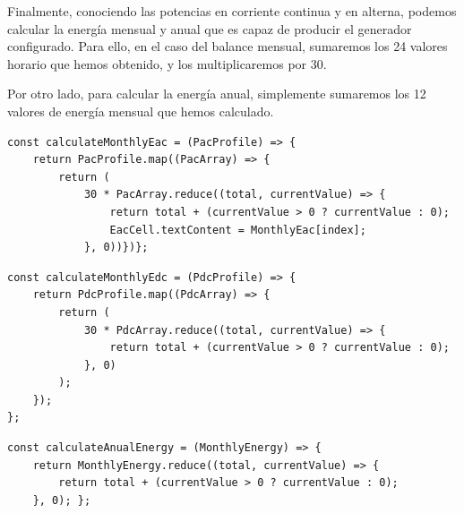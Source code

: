 \begin{enumerate}
Finalmente, conociendo las potencias en corriente continua y en alterna, podemos calcular la energía mensual y anual que es capaz de producir el generador configurado. Para ello, en el caso del balance mensual, sumaremos los 24 valores horario que hemos obtenido, y los multiplicaremos por 30. 

Por otro lado, para calcular la energía anual, simplemente sumaremos los 12 valores de energía mensual que hemos calculado.

\begin{lstlisting}[style=ES6, caption={Cálculo de la energía mensual en alterna}]
const calculateMonthlyEac = (PacProfile) => {
	return PacProfile.map((PacArray) => {
		return (
			30 * PacArray.reduce((total, currentValue) => {
				return total + (currentValue > 0 ? currentValue : 0);
				EacCell.textContent = MonthlyEac[index];
			}, 0))})};
\end{lstlisting}

\begin{lstlisting}[style=ES6, caption={Cálculo de la energía mensual en continua}]
const calculateMonthlyEdc = (PdcProfile) => {
	return PdcProfile.map((PdcArray) => {
		return (
			30 * PdcArray.reduce((total, currentValue) => {
				return total + (currentValue > 0 ? currentValue : 0);
			}, 0)
		);
	});
};
\end{lstlisting}

\begin{lstlisting}[style=ES6, caption={Cálculo de la energía anual}]
const calculateAnualEnergy = (MonthlyEnergy) => {
	return MonthlyEnergy.reduce((total, currentValue) => {
		return total + (currentValue > 0 ? currentValue : 0);
	}, 0); };
\end{lstlisting}



\end{enumerate}